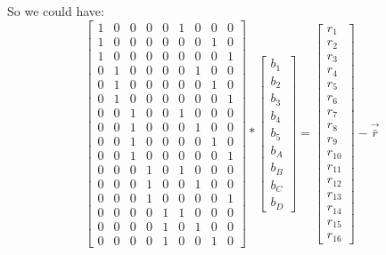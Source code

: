 \documentclass[12pt,a4paper]{article}
\begin{document}
So we could have:
\begin{equation}
\begin{bmatrix}
 1 &  0 &  0 &  0 &  0 &  1 &  0 &  0 &  0 \\
 1 &  0 &  0 &  0 &  0 &  0 &  0 &  1 &  0 \\
 1 &  0 &  0 &  0 &  0 &  0 &  0 &  0 &  1 \\
 0 &  1 &  0 &  0 &  0 &  0 &  1 &  0 &  0 \\
 0 &  1 &  0 &  0 &  0 &  0 &  0 &  1 &  0 \\
 0 &  1 &  0 &  0 &  0 &  0 &  0 &  0 &  1 \\
 0 &  0 &  1 &  0 &  0 &  1 &  0 &  0 &  0 \\
 0 &  0 &  1 &  0 &  0 &  0 &  1 &  0 &  0 \\
 0 &  0 &  1 &  0 &  0 &  0 &  0 &  1 &  0 \\
 0 &  0 &  1 &  0 &  0 &  0 &  0 &  0 &  1 \\
 0 &  0 &  0 &  1 &  0 &  1 &  0 &  0 &  0 \\
 0 &  0 &  0 &  1 &  0 &  0 &  1 &  0 &  0 \\
 0 &  0 &  0 &  1 &  0 &  0 &  0 &  0 &  1 \\
 0 &  0 &  0 &  0 &  1 &  1 &  0 &  0 &  0 \\
 0 &  0 &  0 &  0 &  1 &  0 &  1 &  0 &  0 \\
 0 &  0 &  0 &  0 &  1 &  0 &  0 &  1 &  0
\end{bmatrix}
*
\begin{bmatrix}
b_1\\
b_2\\
b_3\\
b_4\\
b_5\\
b_A\\
b_B\\
b_C\\
b_D
\end{bmatrix}
=
\begin{bmatrix}
r_1\\
r_2\\
r_3\\
r_4\\
r_5\\
r_6\\
r_7\\
r_8\\
r_9\\
r_{10}\\
r_{11}\\
r_{12}\\
r_{13}\\
r_{14}\\
r_{15}\\
r_{16}
\end{bmatrix}
- \vec{\bar{r}}
\end{equation}
\end{document}
